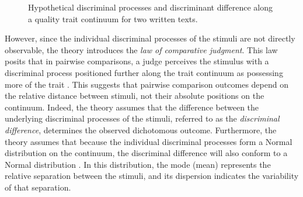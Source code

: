 \documentclass[
  authoryear,
  review,
  1p]{elsarticle}
\begin{document}
\begin{figure}

\begin{minipage}{0.50\linewidth}



\end{minipage}%
%
\begin{minipage}{0.50\linewidth}



\end{minipage}%

\caption{\label{fig-thurstone_theory}Hypothetical discriminal processes
and discriminant difference along a quality trait continuum for two
written texts.}

\end{figure}%

However, since the individual discriminal processes of the stimuli are
not directly observable, the theory introduces the \emph{law of
comparative judgment}. This law posits that in pairwise comparisons, a
judge perceives the stimulus with a discriminal process positioned
further along the trait continuum as possessing more of the trait
\citep{Bramley_2008}. This suggests that pairwise comparison outcomes
depend on the relative distance between stimuli, not their absolute
positions on the continuum. Indeed, the theory assumes that the
difference between the underlying discriminal processes of the stimuli,
referred to as the \emph{discriminal difference}, determines the
observed dichotomous outcome. Furthermore, the theory assumes that
because the individual discriminal processes form a Normal distribution
on the continuum, the discriminal difference will also conform to a
Normal distribution \citep{Andrich_1978}. In this distribution, the mode
(mean) represents the relative separation between the stimuli, and its
dispersion indicates the variability of that separation.
\end{document}
